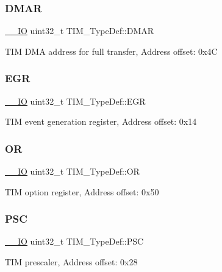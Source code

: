 \subsubsection{\texorpdfstring{DMAR}{DMAR}}
{\footnotesize\ttfamily \mbox{\hyperlink{core__sc300_8h_aec43007d9998a0a0e01faede4133d6be}{\+\_\+\+\_\+\+IO}} uint32\+\_\+t T\+I\+M\+\_\+\+Type\+Def\+::\+D\+M\+AR}

T\+IM D\+MA address for full transfer, Address offset\+: 0x4C \mbox{\label{struct_t_i_m___type_def_a04248d87f48303fd2267810104a7878d}} 
\subsubsection{\texorpdfstring{EGR}{EGR}}
{\footnotesize\ttfamily \mbox{\hyperlink{core__sc300_8h_aec43007d9998a0a0e01faede4133d6be}{\+\_\+\+\_\+\+IO}} uint32\+\_\+t T\+I\+M\+\_\+\+Type\+Def\+::\+E\+GR}

T\+IM event generation register, Address offset\+: 0x14 \mbox{\label{struct_t_i_m___type_def_acb0e8a4efa46dac4a2fb1aa3d45924fd}} 
\subsubsection{\texorpdfstring{OR}{OR}}
{\footnotesize\ttfamily \mbox{\hyperlink{core__sc300_8h_aec43007d9998a0a0e01faede4133d6be}{\+\_\+\+\_\+\+IO}} uint32\+\_\+t T\+I\+M\+\_\+\+Type\+Def\+::\+OR}

T\+IM option register, Address offset\+: 0x50 \mbox{\label{struct_t_i_m___type_def_ad03c852f58077a11e75f8af42fa6d921}} 
\subsubsection{\texorpdfstring{PSC}{PSC}}
{\footnotesize\ttfamily \mbox{\hyperlink{core__sc300_8h_aec43007d9998a0a0e01faede4133d6be}{\+\_\+\+\_\+\+IO}} uint32\+\_\+t T\+I\+M\+\_\+\+Type\+Def\+::\+P\+SC}

T\+IM prescaler, Address offset\+: 0x28 \mbox{\label{struct_t_i_m___type_def_ad432e2a315abf68e6c295fb4ebc37534}} 
